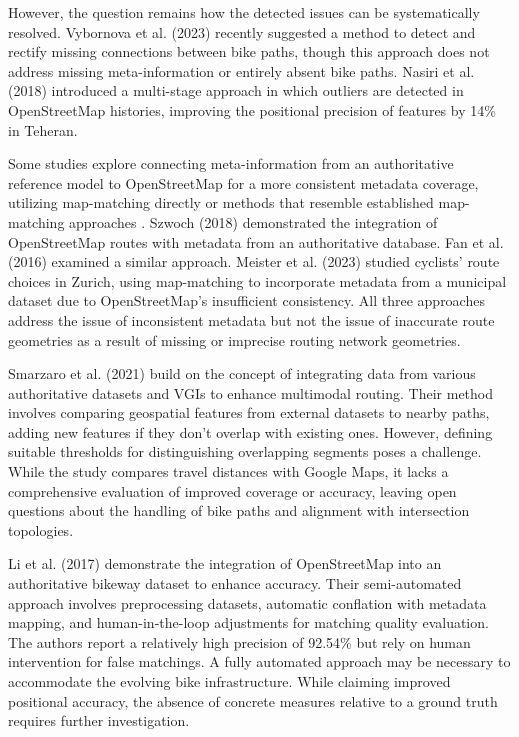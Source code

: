 However, the question remains how the detected issues can be systematically resolved. Vybornova et al. (2023) \cite{vybornova_automated_2023} recently suggested a method to detect and rectify missing connections between bike paths, though this approach does not address missing meta-information or entirely absent bike paths. Nasiri et al. (2018) \cite{nasiri_improving_2018} introduced a multi-stage approach in which outliers are detected in OpenStreetMap histories, improving the positional precision of features by 14\% in Teheran.  

Some studies explore connecting meta-information from an authoritative reference model to OpenStreetMap for a more consistent metadata coverage, utilizing map-matching directly or methods that resemble established map-matching approaches \cite{chao_survey_2020}. Szwoch (2018) \cite{szwoch_combining_2019} demonstrated the integration of OpenStreetMap routes with metadata from an authoritative database. Fan et al. (2016) \cite{fan_polygon-based_2016} examined a similar approach. Meister et al. (2023) \cite{meister_route_2023} studied cyclists' route choices in Zurich, using map-matching to incorporate metadata from a municipal dataset due to OpenStreetMap's insufficient consistency. All three approaches address the issue of inconsistent metadata but not the issue of inaccurate route geometries as a result of missing or imprecise routing network geometries.

Smarzaro et al. (2021) \cite{smarzaro_creation_2021} build on the concept of integrating data from various authoritative datasets and VGIs to enhance multimodal routing. Their method involves comparing geospatial features from external datasets to nearby paths, adding new features if they don't overlap with existing ones. However, defining suitable thresholds for distinguishing overlapping segments poses a challenge. While the study compares travel distances with Google Maps, it lacks a comprehensive evaluation of improved coverage or accuracy, leaving open questions about the handling of bike paths and alignment with intersection topologies.

Li et al. (2017) \cite{li_optimized_2017} demonstrate the integration of OpenStreetMap into an authoritative bikeway dataset to enhance accuracy. Their semi-automated approach involves preprocessing datasets, automatic conflation with metadata mapping, and human-in-the-loop adjustments for matching quality evaluation. The authors report a relatively high precision of 92.54\% but rely on human intervention for false matchings. A fully automated approach may be necessary to accommodate the evolving bike infrastructure. While claiming improved positional accuracy, the absence of concrete measures relative to a ground truth requires further investigation.

